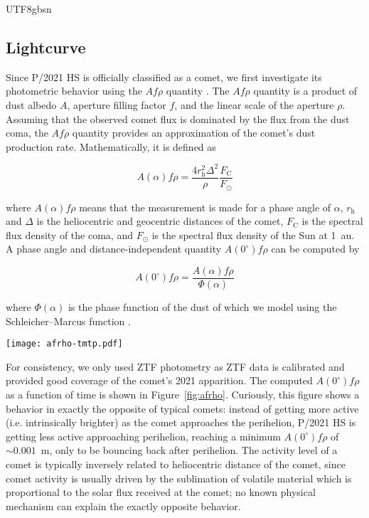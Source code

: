 \documentclass[modern]{aastex631}
\begin{document}
\begin{CJK*}{UTF8}{gbsn}
\subsection{Lightcurve}
\label{sec:lc}

Since P/2021 HS is officially classified as a comet, we first investigate its photometric behavior using the $Af\rho$ quantity \citep{Ahearn1984}. The $Af\rho$ quantity is a product of dust albedo $A$, aperture filling factor $f$, and the linear scale of the aperture $\rho$. Assuming that the observed comet flux is dominated by the flux from the dust coma, the $Af\rho$ quantity provides an approximation of the comet's dust production rate. Mathematically, it is defined as

\begin{equation}
    A(\alpha)f\rho = \frac{4 r_\mathrm{h}^2 \varDelta^2}{\rho} \frac{F_\mathrm{C}}{F_\odot}
\end{equation}

\noindent where $A(\alpha)f\rho$ means that the measurement is made for a phase angle of $\alpha$, $r_\mathrm{h}$ and $\varDelta$ is the heliocentric and geocentric distances of the comet, $F_\mathrm{C}$ is the spectral flux density of the coma, and $F_\odot$ is the spectral flux density of the Sun at 1~au. A phase angle and distance-independent quantity $A(0^\circ)f\rho$ can be computed by

\begin{equation}
    A(0^\circ)f\rho = \frac{A(\alpha)f\rho}{\Phi(\alpha)}
\end{equation}

\noindent where $\Phi(\alpha)$ is the phase function of the dust of which we model using the Schleicher--Marcus function \citep[][also called Halley--Marcus function in some literature]{Schleicher1998,Marcus2007}.

\begin{figure*}
\begin{center}
\texttt{[image: afrho-tmtp.pdf]}
\caption{Dust production metric $A(0^\circ)f\rho$ of P/2021 HS as a function of time, expressed as days to perihelion $T-T_\mathrm{p}$, as derived from $g$, $r$ and $i$-band ZTF photometric measurements. \label{fig:afrho}}
\end{center}
\end{figure*}

For consistency, we only used ZTF photometry as ZTF data is calibrated and provided good coverage of the comet's 2021 apparition. The computed $A(0^\circ)f\rho$ as a function of time is shown in Figure~\ref{fig:afrho}. Curiously, this figure shows a behavior in exactly the opposite of typical comets: instead of getting more active (i.e. intrinsically brighter) as the comet approaches the perihelion, P/2021 HS is getting less active approaching perihelion, reaching a minimum $A(0^\circ)f\rho$ of $\sim0.001$~m, only to be bouncing back after perihelion. The activity level of a comet is typically inversely related to heliocentric distance of the comet, since comet activity is usually driven by the sublimation of volatile material which is proportional to the solar flux received at the comet; no known physical mechanism can explain the exactly opposite behavior.


\end{CJK*}
\end{document}
